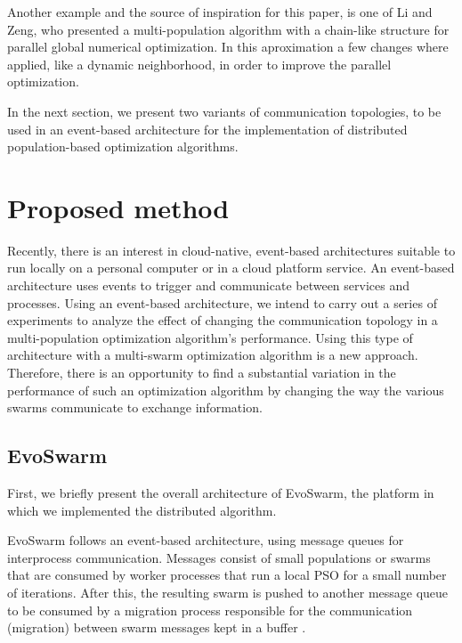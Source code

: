 \documentclass[runningheads]{llncs}
\begin{document}
Another example and the source of inspiration for this paper, is one
of Li and Zeng, %
who presented a multi-population algorithm with a chain-like structure for parallel global
numerical optimization. In this aproximation a few changes where applied, like a dynamic neighborhood,
in order to improve the parallel optimization\cite{b17}.


In the next section, we present two variants of communication topologies,
to be used in an event-based architecture for the implementation of 
distributed population-based optimization algorithms.


\section{Proposed method}

Recently, there is an interest in cloud-native, event-based architectures
suitable to run locally on a personal computer or in a cloud platform service.
An event-based architecture uses events to trigger and communicate between
services and processes. Using an event-based architecture, we intend to carry
out a series of experiments to analyze the effect of changing the communication
topology in a multi-population optimization algorithm's performance. Using this
type of architecture with a multi-swarm optimization algorithm is a new
approach. Therefore, there is an opportunity to find a substantial variation in
the performance of such an optimization algorithm by changing the way the
various swarms communicate to exchange information.

\subsection{EvoSwarm}

First, we briefly present the overall architecture of EvoSwarm, the
platform in which we implemented the distributed algorithm.

EvoSwarm follows an event-based architecture, using message queues for
interprocess communication. Messages consist of small populations or swarms that
are consumed by worker processes that run a local PSO for a small number of
iterations. After this, the resulting swarm is pushed to another message queue
to be consumed by a migration process responsible for the communication
(migration) between swarm messages kept in a buffer \cite{b18}.
\end{document}
